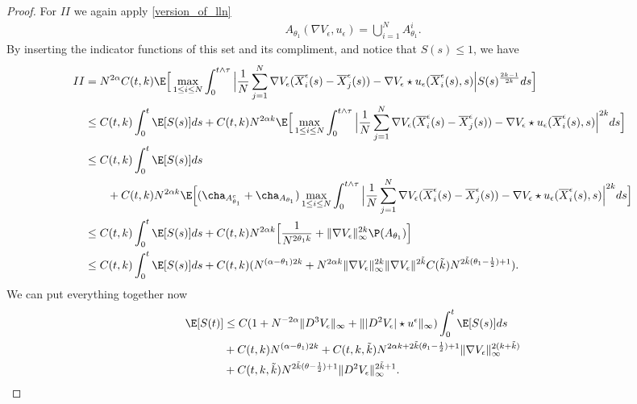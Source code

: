 \begin{proof}
For $II$ we again apply \autoref{version_of_lln} 
\begin{align*}
  A_{\theta_{1} }(\nabla V_{\epsilon},u_\epsilon) =\bigcup_{i=1}^{N} A_{\theta_1}^{i} 
.\end{align*}
By inserting the indicator functions of this set and its compliment, and notice that $S(s)\leq 1$, we have
\begin{align*}
  II &=   N^{2 \alpha  } C(t,k) \E\Big[ \max_{1\leq i\leq N}\int_0^{t \land \tau }  \Big|\frac{1}{N} \sum_{j=1}^N \nabla V_{\epsilon}(\overline{X}_i^{\epsilon}(s) - \overline{X}_j^{\epsilon}(s)  ) - \nabla V_{\epsilon} \star  u_{\epsilon}(\overline{X}_i^{\epsilon}(s),s )\Big|S(s)^{\frac{2k-1}{2k}}  ds \Big]\\
  &\leq C(t,k)\int_0^{t}   \E[S(s)] ds + C(t,k)N^{2\alpha k}\E\Big[ \max_{1\leq i\leq N}\int_0^{t \land \tau }  \Big|\frac{1}{N} \sum_{j=1}^N \nabla V_{\epsilon}(\overline{X}_i^{\epsilon}(s) - \overline{X}_j^{\epsilon}(s)  ) - \nabla V_{\epsilon} \star  u_{\epsilon}(\overline{X}_i^{\epsilon}(s),s )\Big|^{2k}  ds \Big]\\
    &\leq C(t,k)\int_0^{t}   \E[S(s)] ds\\
    &\qquad  + C(t,k)N^{2\alpha k}\E\Big[ (\cha_{A_{\theta_{1}}^{c} } + \cha_{A_{\theta_{1}}}) \max_{1\leq i\leq N}\int_0^{t \land \tau }  \Big|\frac{1}{N} \sum_{j=1}^N \nabla V_{\epsilon}(\overline{X}_i^{\epsilon}(s) - \overline{X}_j^{\epsilon}(s)  ) - \nabla V_{\epsilon} \star  u_{\epsilon}(\overline{X}_i^{\epsilon}(s),s )\Big|^{2k}  ds \Big]\\
    &\le C(t,k)\int_0^{t}   \E[S(s)] ds+ C(t,k)N^{2 \alpha k }  \Big[ \frac{1}{N^{2\theta_1k} } + \|\nabla V_{\epsilon}\|^{2k}_{\infty} \P(A_{\theta_1})   \Big]  \\
     &\le C(t,k)\int_0^{t}   \E[S(s)] ds+ C(t,k)(N^{(\alpha -\theta_1)2k} + N^{2 \alpha  k}  \|\nabla V_{\epsilon}\|_{\infty}^{2k}  \|\nabla V_\epsilon\|^{2 \tilde{k} } C(\tilde{k} )N^{2 \tilde{k}(\theta_1 - \frac{1}{2}) + 1 }) 
.\end{align*}
We can put everything together now 
\begin{align*}
  \E[S(t)] &\le  C(1 + N^{-2 \alpha  } \|D^{3}V_\epsilon \|_{\infty}   + \||D^2 V_{\epsilon}| \star  u^{\epsilon} \|_{\infty} ) \int_0^{t} \E[S(s)] ds\\
           &+ C(t,k)N^{(\alpha  - \theta_1)2k} +  C(t,k,\tilde k)N^{2 \alpha  k + 2 \tilde{k}(\theta_1 - \frac{1}{2}) + 1 } \|\nabla V_{\epsilon}\|_{\infty}^{2(k+\tilde{k} )} \\
           &+ C(t,k,\tilde k)N^{2 \tilde{k}(\theta  - \frac{1}{2}) + 1 } \|D^2V_{\epsilon}\|_{\infty}^{2\tilde{k}+1}  
.\end{align*}


\end{proof}
